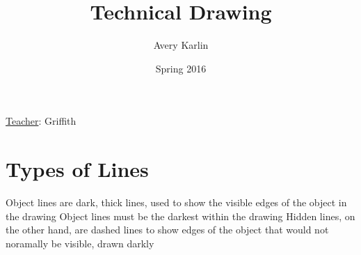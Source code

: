 \documentclass[11 pt, twoside]{article}
\newenvironment{outline*}
{
	\begin{outline}[enumerate]
	}
	{\end{outline}
}
\begin{document}
\title{Technical Drawing}
\author{Avery Karlin}
\date{Spring 2016}
\newcommand{\teacher}{Griffith}

\maketitle
\newpage
\hypertarget{content}{\tableofcontents}
\vspace{11pt}
\noindent
\underline{Teacher}: \teacher
\newpage

\section{Types of Lines}
\begin{outline*}
\1 Object lines are dark, thick lines, used to show the visible edges of the object in the drawing
\2 Object lines must be the darkest within the drawing
\2 Hidden lines, on the other hand, are dashed lines to show edges of the object that would not noramally be visible, drawn darkly

\end{outline*}
\end{document}
